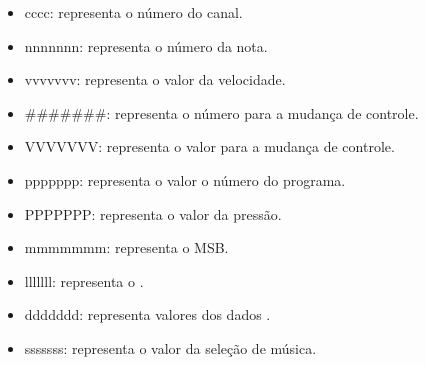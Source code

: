         \begin{itemize}
                \item cccc: representa o número do canal.

                \item nnnnnnn: representa o número da nota.

                \item vvvvvvv: representa o valor da velocidade.

                \item \#\#\#\#\#\#\#: representa o número para a mudança de controle.

                \item VVVVVVV: representa o valor para a mudança de controle.

                \item ppppppp: representa o valor o número do programa.

                \item PPPPPPP: representa o valor da pressão.

                \item mmmmmmm: representa o MSB.

                \item lllllll: representa o .

                \item ddddddd: representa valores dos dados .

                \item sssssss: representa o valor da seleção de música.
        \end{itemize}


